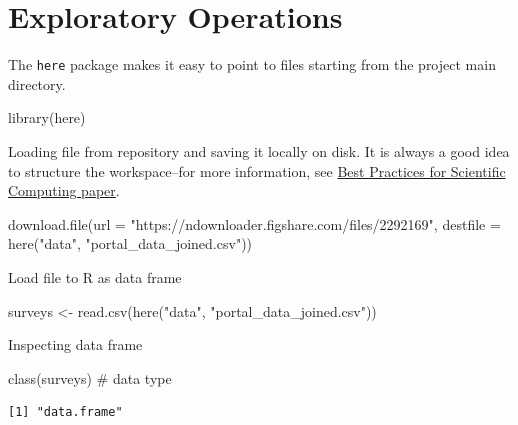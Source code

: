\documentclass[
  letterpaper,
  DIV=11,
  numbers=noendperiod]{scrreprt}
\newenvironment{Shaded}{\begin{snugshade}}{\end{snugshade}}
\newcommand{\AttributeTok}[1]{\textcolor[rgb]{0.40,0.45,0.13}{#1}}
\newcommand{\CommentTok}[1]{\textcolor[rgb]{0.37,0.37,0.37}{#1}}
\newcommand{\FunctionTok}[1]{\textcolor[rgb]{0.28,0.35,0.67}{#1}}
\newcommand{\NormalTok}[1]{\textcolor[rgb]{0.00,0.23,0.31}{#1}}
\newcommand{\OtherTok}[1]{\textcolor[rgb]{0.00,0.23,0.31}{#1}}
\newcommand{\StringTok}[1]{\textcolor[rgb]{0.13,0.47,0.30}{#1}}
\begin{document}
\section{Exploratory Operations}\label{exploratory-operations}

The \texttt{here} package makes it easy to point to files starting from
the project main directory.

\begin{Shaded}
\begin{Highlighting}[]
\FunctionTok{library}\NormalTok{(here)}
\end{Highlighting}
\end{Shaded}

Loading file from repository and saving it locally on disk. It is always
a good idea to structure the workspace--for more information, see
\href{http://journals.plos.org/plosbiology/article?id=10.1371/journal.pbio.1001745}{Best
Practices for Scientific Computing paper}.

\begin{Shaded}
\begin{Highlighting}[]
\FunctionTok{download.file}\NormalTok{(}\AttributeTok{url =} \StringTok{"https://ndownloader.figshare.com/files/2292169"}\NormalTok{, }
    \AttributeTok{destfile =} \FunctionTok{here}\NormalTok{(}\StringTok{"data"}\NormalTok{, }\StringTok{"portal\_data\_joined.csv"}\NormalTok{))}
\end{Highlighting}
\end{Shaded}

Load file to R as data frame

\begin{Shaded}
\begin{Highlighting}[]
\NormalTok{surveys }\OtherTok{\textless{}{-}} \FunctionTok{read.csv}\NormalTok{(}\FunctionTok{here}\NormalTok{(}\StringTok{"data"}\NormalTok{, }\StringTok{"portal\_data\_joined.csv"}\NormalTok{))}
\end{Highlighting}
\end{Shaded}

Inspecting data frame

\begin{Shaded}
\begin{Highlighting}[]
\FunctionTok{class}\NormalTok{(surveys)  }\CommentTok{\# data type}
\end{Highlighting}
\end{Shaded}

\begin{verbatim}
[1] "data.frame"
\end{verbatim}
\end{document}
